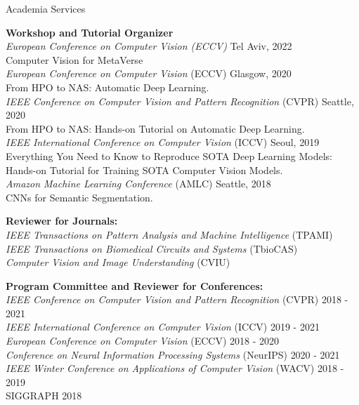 \documentclass{resume} %
\begin{document}
\begin{rSection}{Academia Services}

{\bf Workshop and Tutorial Organizer} \\
{\it European Conference on Computer Vision (ECCV)} \hfill{Tel Aviv, 2022} \\ Computer Vision for MetaVerse \\

{\it European Conference on Computer Vision} (ECCV) \hfill{Glasgow, 2020}\\
From HPO to NAS: Automatic Deep Learning. \\

{\it IEEE Conference on Computer Vision and Pattern Recognition} (CVPR) \hfill{Seattle, 2020}\\
From HPO to NAS: Hands-on Tutorial on Automatic Deep Learning. \\

{\it IEEE International Conference on Computer Vision} (ICCV) \hfill{Seoul, 2019}\\
Everything You Need to Know to Reproduce SOTA Deep Learning Models: \\
Hands-on Tutorial for Training SOTA Computer Vision Models. \\

{\it Amazon Machine Learning Conference} (AMLC) \hfill{Seattle, 2018}\\
CNNs for Semantic Segmentation. 

{\bf Reviewer for Journals:} \\
{\it IEEE Transactions on Pattern Analysis and Machine Intelligence} (TPAMI) \\
{\it IEEE Transactions on Biomedical Circuits and Systems} (TbioCAS) \\
{\it Computer Vision and Image Understanding} (CVIU)

{\bf Program Committee and Reviewer for Conferences:} \\
{\it IEEE Conference on Computer Vision and Pattern Recognition} (CVPR) \hfill{2018 - 2021}\\
{\it IEEE International Conference on Computer Vision} (ICCV)  \hfill{2019 - 2021}\\
{\it European Conference on Computer Vision} (ECCV) \hfill{2018 - 2020}\\
{\it Conference on Neural Information Processing Systems} (NeurIPS) \hfill{2020 - 2021}\\
{\it IEEE Winter Conference on Applications of Computer Vision} (WACV)  \hfill{2018 - 2019}\\
SIGGRAPH  \hfill{2018}


\end{rSection}
\end{document}
